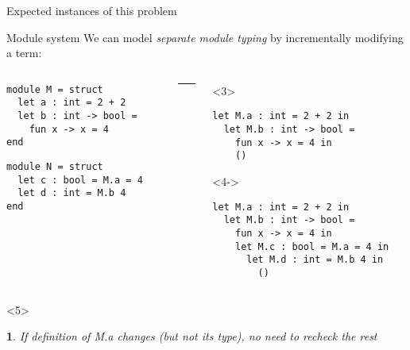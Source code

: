 \documentclass{beamer}
\theoremstyle{example}
\newtheorem{remark}[theorem]{\translate{Remark}}
\begin{document}
\begin{frame}[fragile]{Expected instances of this problem}
  \begin{block}{Module system}
    We can model \emph{separate module typing} by incrementally
    modifying a term:

    \begin{overlayarea}{\textwidth}{13em}
    \small
    \begin{columns}
      \begin{column}{0.4\textwidth}
        \begin{lstlisting}
module M = struct
  let a : int = 2 + 2
  let b : int -> bool =
    fun x -> x = 4
end
        \end{lstlisting}
\pause
        \begin{lstlisting}
module N = struct
  let c : bool = M.a = 4
  let d : int = M.b 4
end
        \end{lstlisting}
      \end{column}
      \begin{column}{1mm}
        \rule{.1mm}{4cm}
      \end{column}
\pause
      \begin{column}{0.5\textwidth}
        \begin{onlyenv}<3>
        \begin{lstlisting}
let M.a : int = 2 + 2 in
  let M.b : int -> bool =
    fun x -> x = 4 in
    ()
        \end{lstlisting}
        \vspace{2.4em}
        \end{onlyenv}
        \begin{onlyenv}<4->
        \begin{lstlisting}
let M.a : int = 2 + 2 in
  let M.b : int -> bool =
    fun x -> x = 4 in
    let M.c : bool = M.a = 4 in
      let M.d : int = M.b 4 in
        ()
        \end{lstlisting}
        \end{onlyenv}
      \end{column}
    \end{columns}
    \end{overlayarea}
    \begin{visibleenv}<5>
      \begin{remark}
        If definition of \textsf{M.a} changes {\footnotesize (but not its type)}, no need to recheck the rest
      \end{remark}
    \end{visibleenv}
  \end{block}
\end{frame}
\end{document}
